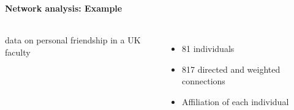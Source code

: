 \documentclass[8pt]{beamer}
\begin{document}
\begin{frame}[fragile]
\frametitle{\insertsection}
\framesubtitle{Network analysis: Example}


\begin{columns}[c]

\begin{minipage}[c][.5\textheight][c]{\linewidth}


{\color{blue}{UKfaculty}} data on personal friendship in a UK faculty
\begin{itemize}
\item 81 individuals
\item 817 directed and weighted connections
\item Affiliation of each individual
\end{itemize}

\medskip
\medskip


\end{minipage}	   



\end{columns}
\end{frame}
\end{document}
